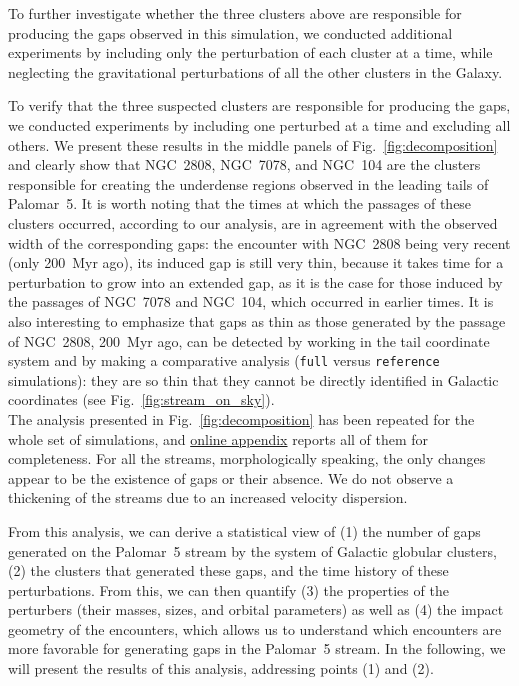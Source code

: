 \documentclass{aa}
\begin{document}
    To further investigate whether the three clusters above are responsible for producing the gaps observed in this simulation, we conducted additional experiments by including only the perturbation of each cluster at a time, while neglecting the gravitational perturbations of all the other clusters in the Galaxy.
    
    To verify that the three suspected clusters are responsible for producing the gaps, we conducted experiments by including one perturbed at a time and excluding all others. We present these results in the middle panels of Fig.~\ref{fig:decomposition} and clearly show that NGC~2808, NGC~7078, and NGC~104 are the clusters responsible for creating the underdense regions observed in the leading tails of Palomar~5. It is worth noting that the times at which the passages of these clusters occurred, according to our analysis, are in agreement with the observed width of the corresponding gaps: the encounter with NGC~2808 being very recent (only 200~Myr ago), its induced gap is still very thin, because it takes time for a perturbation to grow into an extended gap, as it is the case for those induced by the passages of  NGC~7078 and NGC~104, which occurred in earlier times. It is also interesting to emphasize that gaps as thin as those generated by the passage of NGC~2808, 200~Myr ago, can be detected by working in the tail coordinate system and by making a comparative analysis (\texttt{full} versus \texttt{reference} simulations): they are so thin that they cannot be directly identified in Galactic coordinates (see Fig.~\ref{fig:stream_on_sky}).\\

    The analysis presented in Fig.~\ref{fig:decomposition} has been repeated for the whole set of simulations, and \href{https://doi.org/10.5281/zenodo.15528089}{online appendix} reports all of them for completeness. For all the streams, morphologically speaking, the only changes appear to be the existence of gaps or their absence. We do not observe a thickening of the streams due to an increased velocity dispersion. 
    
    From this analysis, we can derive a statistical view of (1) the number of gaps generated on the Palomar~5 stream by the system of Galactic globular clusters, (2) the clusters that generated these gaps, and the time history of these perturbations. From this, we can then quantify (3) the properties of the perturbers (their masses, sizes, and orbital parameters) as well as (4) the impact geometry of the encounters, which allows us to understand which encounters are more favorable for generating gaps in the Palomar~5 stream. In the following, we will present the results of this analysis, addressing points (1) and (2).
\end{document}
